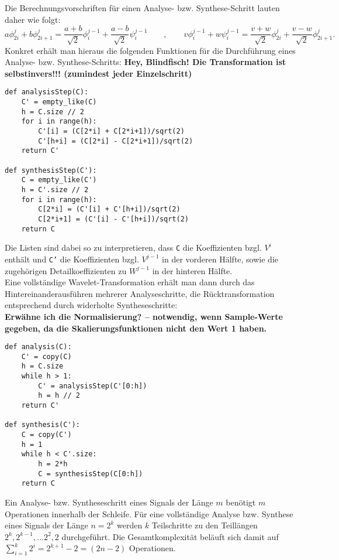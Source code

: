 %
Die Berechnungsvorschriften für einen Analyse- bzw. Synthese-Schritt lauten daher wie folgt:
%
\[
a \phi_{2i}^{j} + b \phi_{2i+1}^{j} = \frac{a + b}{\sqrt{2}} \phi_{i}^{j-1} + \frac{a - b}{\sqrt{2}} \psi_{i}^{j-1}
\qquad , \qquad
v \phi_{i}^{j-1} + w \psi_{i}^{j-1} = \frac{v + w}{\sqrt{2}} \phi_{2i}^{j} + \frac{v - w}{\sqrt{2}} \phi_{2i+1}^{j}
.
\]
%
Konkret erhält man hieraus die folgenden Funktionen für die Durchführung eines Analyse- bzw. Synthese-Schritts: \textbf{Hey, Blindfisch! Die Transformation ist selbstinvers!!! (zumindest jeder Einzelschritt)}
%
\begin{verbatim}
def analysisStep(C):
    C' = empty_like(C)
    h = C.size // 2
    for i in range(h):
        C'[i] = (C[2*i] + C[2*i+1])/sqrt(2)
        C'[h+i] = (C[2*i] - C[2*i+1])/sqrt(2)
    return C'

def synthesisStep(C'):
    C = empty_like(C')
    h = C'.size // 2
    for i in range(h):
        C[2*i] = (C'[i] + C'[h+i])/sqrt(2)
        C[2*i+1] = (C'[i] - C'[h+i])/sqrt(2)
    return C
\end{verbatim}
%
Die Listen sind dabei so zu interpretieren, dass \texttt{C} die Koeffizienten bzgl. $V^i$ enthält und \texttt{C'} die Koeffizienten bzgl. $V^{j-1}$ in der vorderen Hälfte, sowie die zugehörigen Detailkoeffizienten zu $W^{j-1}$ in der hinteren Hälfte.\\
Eine vollständige Wavelet-Transformation erhält man dann durch das Hintereinanderausführen mehrerer Analyseschritte, die Rücktransformation entsprechend durch widerholte Syntheseschritte:
\\
\textbf{Erwähne ich die Normalisierung? -- notwendig, wenn Sample-Werte gegeben, da die Skalierungsfunktionen nicht den Wert 1 haben.}
\begin{verbatim}
def analysis(C):
    C' = copy(C)
    h = C.size
    while h > 1:
        C' = analysisStep(C'[0:h])
        h = h // 2
    return C'

def synthesis(C'):
    C = copy(C')
    h = 1
    while h < C'.size:
        h = 2*h
        C = synthesisStep(C[0:h])
    return C
\end{verbatim}
%
Ein Analyse- bzw. Syntheseschritt eines Signals der Länge $m$ benötigt $m$ Operationen innerhalb der Schleife. Für eine vollständige Analyse bzw. Synthese eines Signals der Länge $n=2^k$ werden $k$ Teilschritte zu den Teillängen $2^k, 2^{k-1}, ... 2^2, 2$ durchgeführt. Die Gesamtkomplexität beläuft sich damit auf $\sum_{i=1}^k 2^i = 2^{k+1}-2 = (2n-2)$ Operationen.
%
